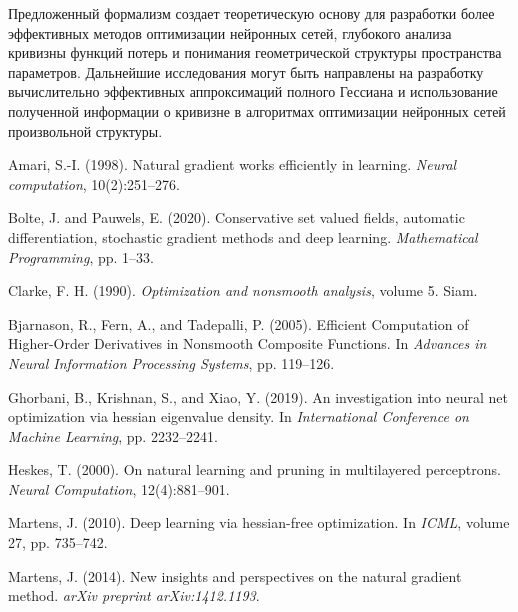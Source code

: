 \documentclass[11pt]{article}
\begin{document}
Предложенный формализм создает теоретическую основу для разработки более эффективных методов оптимизации
нейронных сетей, глубокого анализа кривизны функций потерь и понимания геометрической структуры пространства
параметров. Дальнейшие исследования могут быть направлены на разработку вычислительно эффективных
аппроксимаций полного Гессиана и использование полученной информации о кривизне в алгоритмах оптимизации
нейронных сетей произвольной структуры.


\begin{thebibliography}{10}
  Amari, S.-I. (1998).
  \newblock Natural gradient works efficiently in learning.
  \newblock \textit{Neural computation}, 10(2):251--276.

  Bolte, J. and Pauwels, E. (2020).
  \newblock Conservative set valued fields, automatic differentiation, stochastic gradient methods and deep learning.
  \newblock \textit{Mathematical Programming}, pp. 1--33.

  Clarke, F. H. (1990).
  \newblock \textit{Optimization and nonsmooth analysis}, volume 5.
  \newblock Siam.

  Bjarnason, R., Fern, A., and Tadepalli, P. (2005).
  \newblock Efficient Computation of Higher-Order Derivatives in Nonsmooth Composite Functions.
  \newblock In \textit{Advances in Neural Information Processing Systems}, pp. 119--126.

  Ghorbani, B., Krishnan, S., and Xiao, Y. (2019).
  \newblock An investigation into neural net optimization via hessian eigenvalue density.
  \newblock In \textit{International Conference on Machine Learning}, pp. 2232--2241.

  Heskes, T. (2000).
  \newblock On natural learning and pruning in multilayered perceptrons.
  \newblock \textit{Neural Computation}, 12(4):881--901.

  Martens, J. (2010).
  \newblock Deep learning via hessian-free optimization.
  \newblock In \textit{ICML}, volume 27, pp. 735--742.

  Martens, J. (2014).
  \newblock New insights and perspectives on the natural gradient method.
  \newblock \textit{arXiv preprint arXiv:1412.1193}.


\end{thebibliography}
\end{document}
